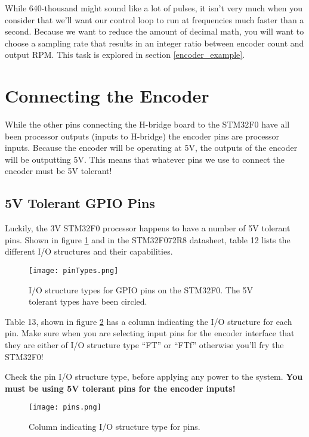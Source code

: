 \documentclass[openany,11pt,fleqn]{book} %
\begin{document}
While 640-thousand might sound like a lot of pulses, it isn't very much when you consider that we'll want our control loop to run at frequencies much faster than a second. Because we want to reduce the amount of decimal math, you will want to choose a sampling rate that results in an integer ratio between encoder count and output RPM. This task is explored in section \ref{encoder_example}.

\section{Connecting the Encoder}
While the other pins connecting the H-bridge board to the STM32F0 have all been processor outputs (inputs to H-bridge) the encoder pins are processor inputs. Because the encoder will be operating at 5V, the outputs of the encoder will be outputting 5V. This means that whatever pins we use to connect the encoder must be 5V tolerant!

\subsection{5V Tolerant GPIO Pins}
Luckily, the 3V STM32F0 processor happens to have a number of 5V tolerant pins. Shown in figure \ref{pinTypes} and in the STM32F072R8 datasheet, table 12 lists the different I/O structures and their capabilities.  

\begin{figure}[tb]
    \centering\texttt{[image: pinTypes.png]}
    \caption{I/O structure types for GPIO pins on the STM32F0. The 5V tolerant types have been circled.}
    \label{pinTypes}
\end{figure}

Table 13, shown in figure \ref{pins} has a column indicating the I/O structure for each pin. Make sure when you are selecting input pins for the encoder interface that they are either of I/O structure type ``FT'' or ``FTf'' otherwise you'll fry the STM32F0!

\begin{warning}
    Check the pin I/O structure type, before applying any power to the system. \textbf{You must be using 5V tolerant pins for the encoder inputs!} 
\end{warning}



\begin{figure}[tb]
    \centering\texttt{[image: pins.png]}
    \caption{Column indicating I/O structure type for pins.}
    \label{pins}
\end{figure}
\end{document}
